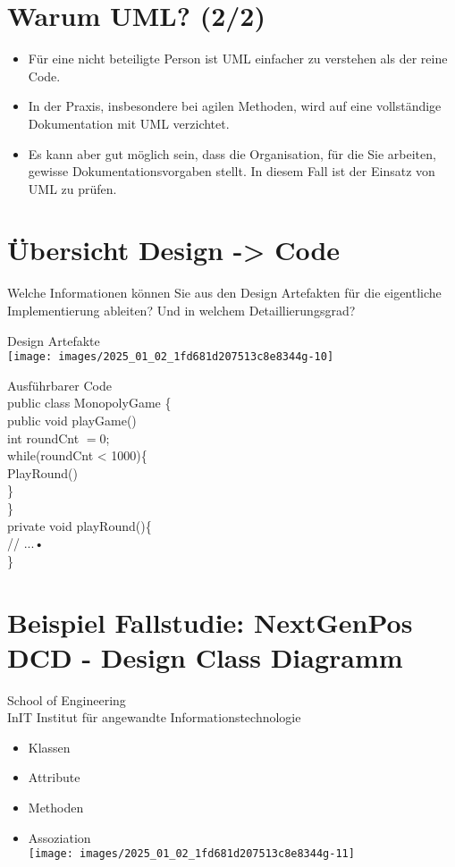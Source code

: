 \documentclass[10pt]{article}
\begin{document}
\section*{Warum UML? (2/2)}
\begin{itemize}
  \item Für eine nicht beteiligte Person ist UML einfacher zu verstehen als der reine Code.
  \item In der Praxis, insbesondere bei agilen Methoden, wird auf eine vollständige Dokumentation mit UML verzichtet.
  \item Es kann aber gut möglich sein, dass die Organisation, für die Sie arbeiten, gewisse Dokumentationsvorgaben stellt. In diesem Fall ist der Einsatz von UML zu prüfen.
\end{itemize}

\section*{Übersicht Design -> Code}
Welche Informationen können Sie aus den Design Artefakten für die eigentliche Implementierung ableiten? Und in welchem Detaillierungsgrad?

Design Artefakte\\
\texttt{[image: images/2025\_01\_02\_1fd681d207513c8e8344g-10]}

Ausführbarer Code\\
public class MonopolyGame \{\\
public void playGame()\\
int roundCnt $=0$;\\
while(roundCnt < 1000)\{\\
PlayRound()\\
\}\\
\}\\
private void playRound()\{\\
// ...•\\
\}

\section*{Beispiel Fallstudie: NextGenPos DCD - Design Class Diagramm}
School of Engineering\\
InIT Institut für angewandte Informationstechnologie

\begin{itemize}
  \item Klassen
  \item Attribute
  \item Methoden
  \item Assoziation\\
\texttt{[image: images/2025\_01\_02\_1fd681d207513c8e8344g-11]}
\end{itemize}
\end{document}
